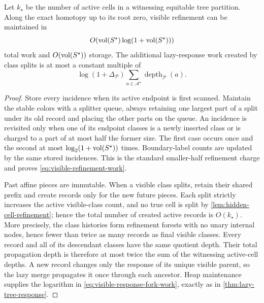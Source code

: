 \begin{lemma}
\label{lem:visible-refinement-work}
Let $k_\star$ be the number of active cells in a witnessing equitable tree
partition.  Along the exact homotopy up to its root zero, visible refinement
can be maintained in
\begin{equation}
 O\!\left(
  \operatorname{vol}(S^\star)\log(1+\operatorname{vol}(S^\star))
 \right)
 \label{eq:visible-refinement-work}
\end{equation}
total work and $O(\operatorname{vol}(S^\star))$ storage.  The additional lazy-response work
created by class splits is at most a constant multiple of
\begin{equation}
 \log(1+\Delta_{\mathcal P})
 \sum_{a\in\mathcal A^\star}
 \operatorname{depth}_{\mathcal P}(a).
 \label{eq:visible-response-fork-work}
\end{equation}
\end{lemma}

\begin{proof}
Store every incidence when its active endpoint is first scanned.  Maintain
the stable colors with a splitter queue, always retaining one largest part of
a split under its old record and placing the other parts on the queue.  An
incidence is revisited only when one of its endpoint classes is a newly
inserted class or is charged to a part of at most half the former size.  The
first case occurs once and the second at most
$\log_2(1+\operatorname{vol}(S^\star))$ times.  Boundary-label counts are updated by the
same stored incidences.  This is the standard smaller-half refinement charge
and proves \cref{eq:visible-refinement-work}.

Past affine pieces are immutable.  When a visible class splits, retain their
shared prefix and create records only for the new future pieces.  Each split
strictly increases the active visible-class count, and no true cell is split
by \cref{lem:hidden-cell-refinement}; hence the total number of created active
records is $O(k_\star)$.  More precisely, the class histories form refinement
forests with no unary internal nodes, hence fewer than twice as many records
as final visible classes.  Every record and all of its descendant classes
have the same quotient depth.  Their total propagation depth is therefore at
most twice the sum of the witnessing active-cell depths.  A new record changes
only the response of its unique visible parent, so the lazy merge propagates
it once through each ancestor.  Heap maintenance supplies the logarithm in
\cref{eq:visible-response-fork-work}, exactly as in
\cref{thm:lazy-tree-response}.
\end{proof}

